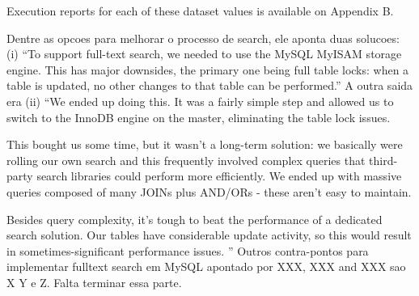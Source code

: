 Execution reports for each of these dataset values is available on Appendix B.






Dentre as opcoes para melhorar o processo de search, ele aponta duas solucoes: (i) ``To support full-text search, we needed to use the MySQL MyISAM storage engine. This has major downsides, the primary one being full table locks: when a table is updated, no other changes to that table can be performed.'' A outra saida era (ii) ``We ended up doing this. It was a fairly simple step and allowed us to switch to the InnoDB engine on the master, eliminating the table lock issues.

This bought us some time, but it wasn't a long-term solution: we basically were rolling our own search and this frequently involved complex queries that third-party search libraries could perform more efficiently. We ended up with massive queries composed of many JOINs plus AND/ORs - these aren't easy to maintain.

Besides query complexity, it's tough to beat the performance of a dedicated search solution. Our tables have considerable update activity, so this would result in sometimes-significant performance issues.
''
Outros contra-pontos para implementar fulltext search em MySQL apontado por XXX, XXX and XXX sao X Y e Z. Falta terminar essa parte.


